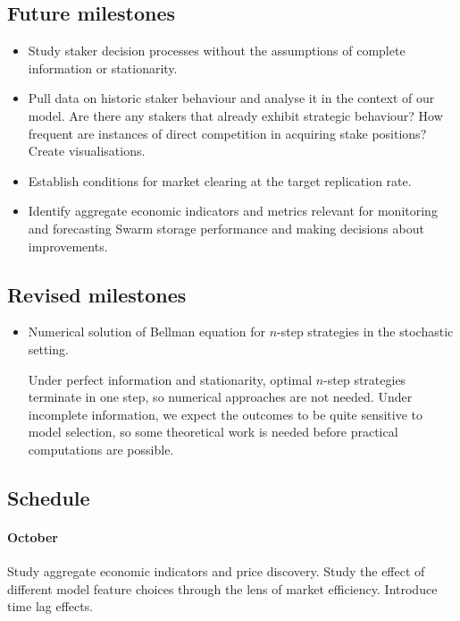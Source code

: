 \subsection*{Future milestones}
\begin{itemize}  
  \item Study staker decision processes without the assumptions of complete information or stationarity.
  \item Pull data on historic staker behaviour and analyse it in the context of our model. Are there any stakers that already exhibit strategic behaviour? How frequent are instances of direct competition in acquiring stake positions? Create visualisations.
  \item Establish conditions for market clearing at the target replication rate.
  \item Identify aggregate economic indicators and metrics relevant for monitoring and forecasting Swarm storage performance and making decisions about improvements.
\end{itemize}

\subsection*{Revised milestones}

\begin{itemize}
  \item Numerical solution of Bellman equation for $n$-step strategies in the stochastic setting. 
  
  Under perfect information and stationarity, optimal $n$-step strategies terminate in one step, so numerical approaches are not needed.
  Under incomplete information, we expect the outcomes to be quite sensitive to model selection, so some theoretical work is needed before practical computations are possible.

\end{itemize}

\subsection*{Schedule}

\paragraph{October} 
Study aggregate economic indicators and price discovery.
%
Study the effect of different model feature choices through the lens of market efficiency.
%
Introduce time lag effects. 

